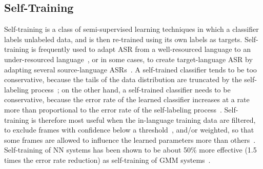 
\subsection{Self-Training}

Self-training is a class of semi-supervised learning techniques in
which a classifier labels unlabeled data, and is then
re-trained using its own labels as targets.  Self-training is
frequently used to adapt ASR from a well-resourced language to an
under-resourced language~\cite{Loof2009,Cetin2008}, or in some cases,
to create target-language ASR by adapting several source-language
ASRs~\cite{Vu2011b}.  A self-trained classifier tends to be too
conservative, because the tails of the data distribution are truncated
by the self-labeling process~\cite{Scudder1965}; on the other hand, a
self-trained classifier needs to be conservative, because the error
rate of the learned classifier increases at a rate more than
proportional to the error rate of the self-labeling
process~\cite{Huang2013b}.  Self-training is therefore most useful
when the in-language training data are filtered, to exclude
frames with confidence below a threshold~\cite{vesely2013-semi},
and/or weighted, so that some frames are allowed to influence the
learned parameters more than others~\cite{Hsiao2013}.  Self-training
of NN systems has been shown to be about 50\% more effective (1.5
times the error rate reduction) as self-training of GMM
systems~\cite{Huang2013b}.
